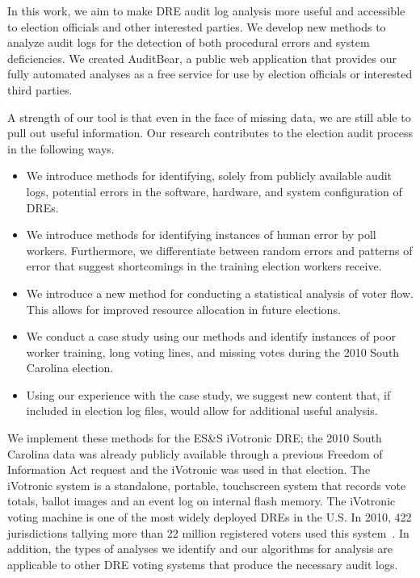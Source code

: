 \documentclass[letterpaper,twocolumn,10pt]{article}
\begin{document}
In this work, we aim to make DRE audit log analysis more useful and accessible
to election officials and other interested parties. We develop new methods to
analyze audit logs for the detection of both procedural errors and system
deficiencies. We created AuditBear, a public web application that provides our 
fully automated analyses as a free service for use by election officials or
interested third parties.  

A strength of our tool is that even in the face of missing data, we are still 
able to pull out useful information. Our research contributes to the election 
audit process in the following ways.

\begin{itemize}
\item We introduce methods for identifying, solely from publicly available audit
  logs, potential errors in the software, hardware, and system configuration of
  DREs.
\item We introduce methods for identifying instances of human error by poll
  workers. Furthermore, we differentiate between random
  errors and patterns of error that suggest shortcomings in the training
  election workers receive.
\item We introduce a new method for conducting a statistical analysis of voter
  flow. This allows for improved resource allocation in future elections.
\item We conduct a case study using our methods and identify instances of poor
  worker training, long voting lines, and missing votes during the 2010 South
  Carolina election.
\item Using our experience with the case study, we suggest new content that, if
  included in election log files, would allow for additional useful analysis.
\end{itemize}

We implement these methods for the ES\&S 
iVotronic DRE; the 2010 South Carolina data was already publicly available 
through a previous Freedom of Information Act request and the iVotronic was 
used in that election. The iVotronic system is a standalone, portable, 
touchscreen system that records vote totals, ballot images and an event log 
on internal flash memory. The iVotronic voting machine is one of the most 
widely deployed DREs in the U.S. In 2010, 422 jurisdictions tallying more 
than 22 million registered voters used this system~\cite{VerVot2010}. In 
addition, the types of analyses we identify and our algorithms for analysis 
are applicable to other DRE voting systems that produce the necessary audit 
logs. 
\end{document}
